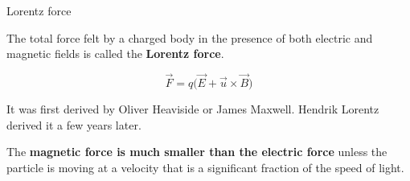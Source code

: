 %
%
%

\begin{frame}{Lorentz force}

The total force felt by a charged body in the presence of
both electric and magnetic fields is called the {\bf Lorentz force}.

\begin{equation*}
  \vec{F} = q \Big( \vec{E} + \vec{u} \times \vec{B} \Big)
\end{equation*}

\vspace{0.3cm}

It was first derived by Oliver Heaviside or James Maxwell.
Hendrik Lorentz derived it a few years later.\\

\vspace{0.3cm}

The {\bf magnetic force is much smaller than the electric force}
unless the particle is moving at a velocity that is a significant fraction of the speed of light.

\end{frame}

%
%
%

